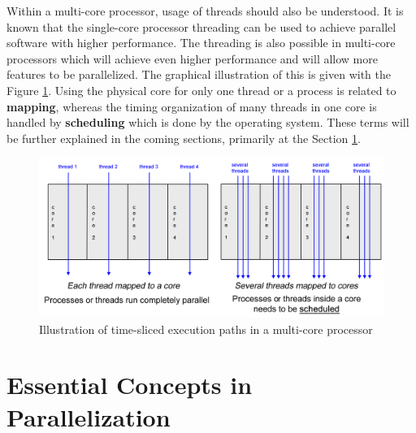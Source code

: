 Within a multi-core processor, usage of threads should also be understood. It is known that the single-core processor threading can be used to achieve parallel software with higher performance. The threading is also possible in multi-core processors which will achieve even higher performance and will allow more features to be parallelized. The graphical illustration of this is given with the Figure \ref{fig:differentthreading}. Using the physical core for only one thread or a process is related to \textbf{mapping}, whereas the timing organization of many threads in one core is handled by \textbf{scheduling} which is done by the operating system. These terms will be further explained in the coming sections, primarily at the Section \ref{parallelismconcepts}.

\begin{figure}[!ht]
	\centering
	\captionsetup{justification=centering}
	\includegraphics[width=\textwidth]{content/images/differentthreading.png}
	\caption{Illustration of time-sliced execution paths in a multi-core processor \cite{multicore1}}
	\label{fig:differentthreading}
\end{figure}

\section{Essential Concepts in Parallelization} \label{parallelismconcepts}

